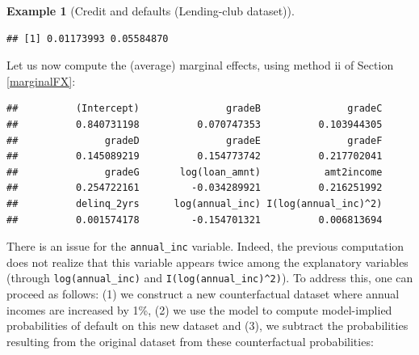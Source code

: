 \documentclass[
  12pt,
]{book}
\newenvironment{Shaded}{\begin{snugshade}}{\end{snugshade}}
\newcommand{\AttributeTok}[1]{\textcolor[rgb]{0.13,0.29,0.53}{#1}}
\newcommand{\CommentTok}[1]{\textcolor[rgb]{0.56,0.35,0.01}{\textit{#1}}}
\newcommand{\ConstantTok}[1]{\textcolor[rgb]{0.56,0.35,0.01}{#1}}
\newcommand{\FloatTok}[1]{\textcolor[rgb]{0.00,0.00,0.81}{#1}}
\newcommand{\FunctionTok}[1]{\textcolor[rgb]{0.13,0.29,0.53}{\textbf{#1}}}
\newcommand{\NormalTok}[1]{#1}
\newcommand{\OtherTok}[1]{\textcolor[rgb]{0.56,0.35,0.01}{#1}}
\newcommand{\SpecialCharTok}[1]{\textcolor[rgb]{0.81,0.36,0.00}{\textbf{#1}}}
\newcommand{\StringTok}[1]{\textcolor[rgb]{0.31,0.60,0.02}{#1}}
\theoremstyle{definition}
\theoremstyle{definition}
\newtheorem{example}{Example}[chapter]
\theoremstyle{definition}
\theoremstyle{definition}
\theoremstyle{remark}
\begin{document}
\begin{example}[Credit and defaults (Lending-club dataset)]
\begin{verbatim}
## [1] 0.01173993 0.05584870
\end{verbatim}

Let us now compute the (average) marginal effects, using method ii of Section \ref{marginalFX}:

\begin{Shaded}
\end{Shaded}

\begin{verbatim}
##          (Intercept)               gradeB               gradeC 
##          0.840731198          0.070747353          0.103944305 
##               gradeD               gradeE               gradeF 
##          0.145089219          0.154773742          0.217702041 
##               gradeG       log(loan_amnt)           amt2income 
##          0.254722161         -0.034289921          0.216251992 
##          delinq_2yrs      log(annual_inc) I(log(annual_inc)^2) 
##          0.001574178         -0.154701321          0.006813694
\end{verbatim}

There is an issue for the \texttt{annual\_inc} variable. Indeed, the previous computation does not realize that this variable appears twice among the explanatory variables (through \texttt{log(annual\_inc)} and \texttt{I(log(annual\_inc)\^{}2)}). To address this, one can proceed as follows: (1) we construct a new counterfactual dataset where annual incomes are increased by 1\%, (2) we use the model to compute model-implied probabilities of default on this new dataset and (3), we subtract the probabilities resulting from the original dataset from these counterfactual probabilities:

\begin{Shaded}
\end{Shaded}


\end{example}
\end{document}
